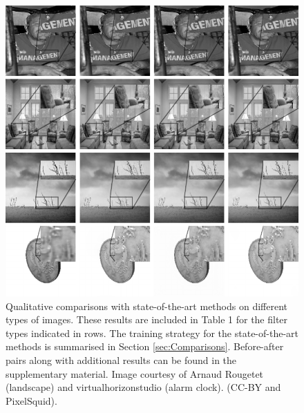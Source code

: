 \begin{figure}%
  \centering
  \includegraphics[width=.9\linewidth]{Chapters/detail-retouching-figs/Qualitative_zoomed_BF.pdf}
    \caption{Qualitative comparisons with state-of-the-art methods on different types of images. These results are included in Table 1 for the filter types indicated in rows. The training strategy for the state-of-the-art methods is summarised in Section \ref{sec:Comparisons}. Before-after pairs along with additional results can be found in the supplementary material. Image courtesy of Arnaud Rougetet (landscape) and virtualhorizonstudio (alarm clock). (CC-BY and PixelSquid).} 

   \label{fig:QualitativeComp}%
\end{figure}

